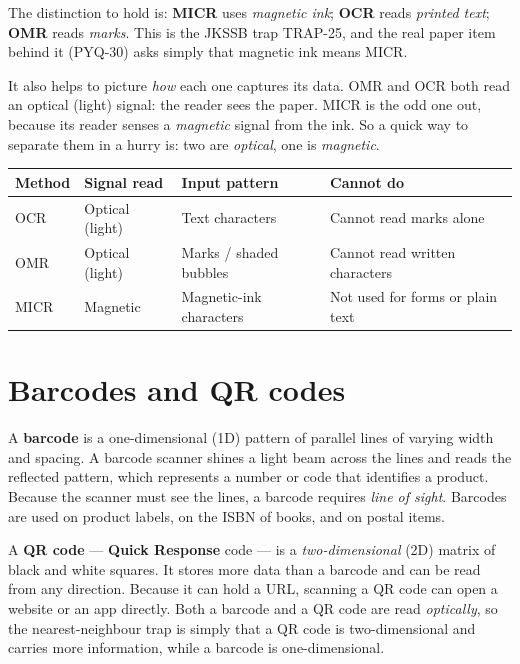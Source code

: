 The distinction to hold is: \textbf{MICR} uses \emph{magnetic ink};
\textbf{OCR} reads \emph{printed text}; \textbf{OMR} reads \emph{marks}. This
is the JKSSB trap TRAP-25, and the real paper item behind it (PYQ-30) asks
simply that magnetic ink means MICR.

It also helps to picture \emph{how} each one captures its data. OMR and OCR
both read an optical (light) signal: the reader sees the paper. MICR is the
odd one out, because its reader senses a \emph{magnetic} signal from the ink.
So a quick way to separate them in a hurry is: two are \emph{optical}, one is
\emph{magnetic}.

\begin{center}
\begin{tabular}{p{}p{}p{}p{}}
\toprule
\textbf{Method} & \textbf{Signal read} & \textbf{Input pattern} & \textbf{Cannot do} \\
\midrule
OCR & Optical (light) & Text characters & Cannot read marks alone \\
OMR & Optical (light) & Marks / shaded bubbles & Cannot read written characters \\
MICR & Magnetic & Magnetic-ink characters & Not used for forms or plain text \\
\bottomrule
\end{tabular}
\end{center}

\section{Barcodes and QR codes}
A \textbf{barcode} is a one-dimensional (1D) pattern of parallel lines of
varying width and spacing. A barcode scanner shines a light beam across the
lines and reads the reflected pattern, which represents a number or code
that identifies a product. Because the scanner must see the lines, a barcode
requires \emph{line of sight}. Barcodes are used on product labels, on the
ISBN of books, and on postal items.

A \textbf{QR code} --- \textbf{Quick Response} code --- is a
\emph{two-dimensional} (2D) matrix of black and white squares. It stores
more data than a barcode and can be read from any direction. Because it can
hold a URL, scanning a QR code can open a website or an app directly. Both a
barcode and a QR code are read \emph{optically}, so the nearest-neighbour
trap is simply that a QR code is two-dimensional and carries more
information, while a barcode is one-dimensional.

